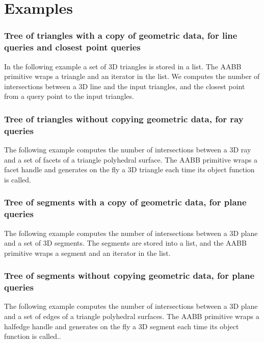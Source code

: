 \section{Examples}
\label{AABB_tree_section_examples}

\subsubsection{Tree of triangles with a copy of geometric data, for line queries and closest point queries}
In the following example a set of 3D triangles is stored in a list. The AABB primitive wraps a triangle and an iterator in the list. We computes the number of intersections between a 3D line and the input triangles, and the closest point from a query point to the input triangles.

\subsubsection{Tree of triangles without copying geometric data, for ray queries}
The following example computes the number of intersections between a 3D ray and a set of facets of a triangle polyhedral surface. The AABB primitive wraps a facet handle and generates on the fly a 3D triangle each time its object function is called.

\subsubsection{Tree of segments with a copy of geometric data, for plane queries}
The following example computes the number of intersections between a 3D plane and a set of 3D segments. The segments are stored into a list, and the AABB primitive wraps a segment and an iterator in the list.

\subsubsection{Tree of segments without copying geometric data, for plane queries}
The following example computes the number of intersections between a 3D plane and a set of edges of a triangle polyhedral surfaces. The AABB primitive wraps a halfedge handle and generates on the fly a 3D segment each time its object function is called..
